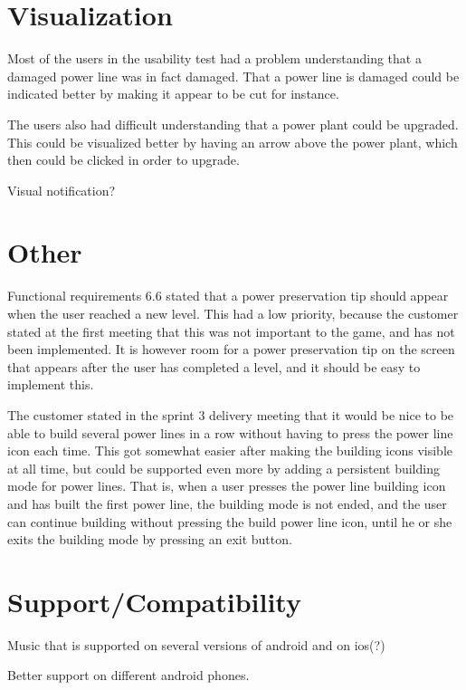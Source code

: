 \section*{Visualization}

Most of the users in the usability test had a problem understanding that a damaged power 
line was in fact damaged. That a power line is damaged could be indicated better by making 
it appear to be cut for instance.

The users also had difficult understanding that a power plant could be upgraded. This could 
be visualized better by having an arrow above the power plant, which then could be clicked in 
order to upgrade.

Visual notification?

\section*{Other}

Functional requirements 6.6 stated that a power preservation tip should appear when the user 
reached a new level. This had a low priority, because the customer stated at the first meeting 
that this was not important to the game, and has not been implemented. It is however room for a 
power preservation tip on the screen that appears after the user has completed a level, and it 
should be easy to implement this.

The customer stated in the sprint 3 delivery meeting that it would be nice to be able to build 
several power lines in a row without having to press the power line icon each time. This got 
somewhat easier after making the building icons visible at all time, but could be supported even 
more by adding a persistent building mode for power lines. That is, when a user presses the power 
line building icon and has built the first power line, the building mode is not ended, and the user 
can continue building without pressing the build power line icon, until he or she exits the building 
mode by pressing an exit button.

\section*{Support/Compatibility}

Music that is supported on several versions of android and on ios(?)

Better support on different android phones.